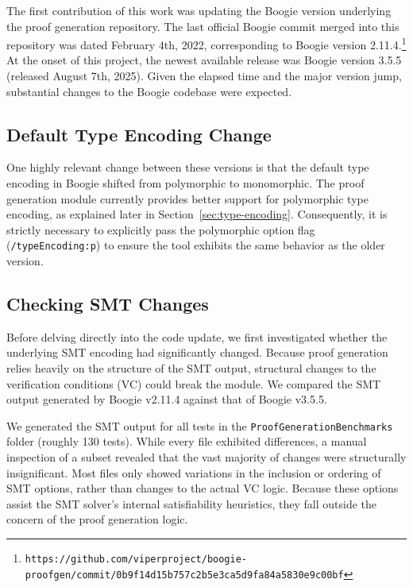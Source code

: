 \documentclass[11pt]{article}
\begin{document}
The first contribution of this work was updating the Boogie version underlying the proof generation repository.
The last official Boogie commit merged into this repository was dated February 4th, 2022, corresponding to Boogie version 2.11.4.\footnote{\texttt{https://github.com/viperproject/boogie-proofgen/commit/0b9f14d15b757c2b5e3ca5d9fa84a5830e9c00bf}}
At the onset of this project, the newest available release was Boogie version 3.5.5 (released August 7th, 2025).
Given the elapsed time and the major version jump, substantial changes to the Boogie codebase were expected.

\subsection{Default Type Encoding Change}
\label{sec:default-type-encoding}

One highly relevant change between these versions is that the default type encoding in Boogie shifted from polymorphic to monomorphic.
The proof generation module currently provides better support for polymorphic type encoding,
as explained later in Section~\ref{sec:type-encoding}.
Consequently, it is strictly necessary to explicitly pass the polymorphic option flag (\texttt{/typeEncoding:p})
to ensure the tool exhibits the same behavior as the older version.

\subsection{Checking SMT Changes}

Before delving directly into the code update, we first investigated whether the underlying SMT encoding had significantly changed.
Because proof generation relies heavily on the structure of the SMT output, structural changes to the verification conditions (VC) could break the module.
We compared the SMT output generated by Boogie v2.11.4 against that of Boogie v3.5.5.%

We generated the SMT output for all tests in the \texttt{ProofGenerationBenchmarks} folder (roughly 130 tests).
While every file exhibited differences, a manual inspection of a subset revealed that the vast majority of changes were structurally insignificant.
Most files only showed variations in the inclusion or ordering of SMT options, rather than changes to the actual VC logic.
Because these options assist the SMT solver's internal satisfiability heuristics, they fall outside the concern of the proof generation logic.
\end{document}
